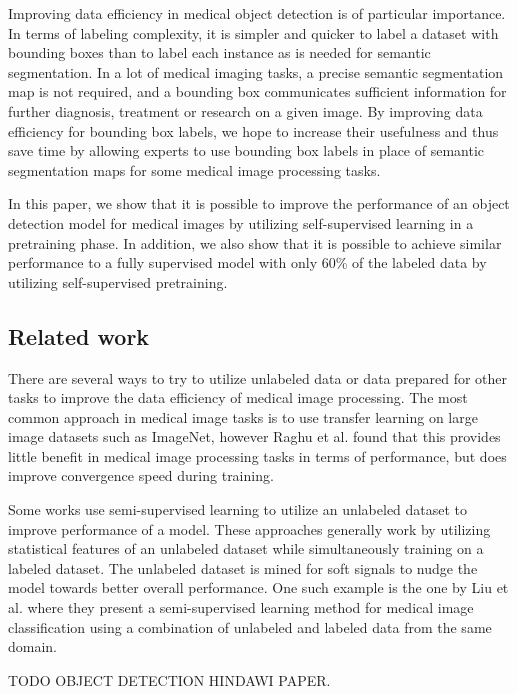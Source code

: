 \documentclass[conference]{IEEEtran}
\begin{document}
Improving data efficiency in medical object detection is of particular importance. 
In terms of labeling complexity, it is 
simpler and quicker to label a dataset with bounding boxes than to label each instance as is 
needed for semantic segmentation. In a lot of medical imaging tasks, a precise semantic 
segmentation map is not required, and a bounding box communicates sufficient information for 
further diagnosis, treatment or research on a given image. By improving data efficiency for 
bounding box labels, we hope to increase their usefulness and thus save time by allowing experts 
to use bounding box labels in place of semantic segmentation maps for some medical image processing
tasks.

In this paper, we show that it is possible to improve the performance of an object detection model
for medical images by utilizing self-supervised learning in a pretraining phase. In addition, we
also show that it is possible to achieve similar performance to a fully supervised model with
only 60\% of the labeled data by utilizing self-supervised pretraining.

\subsection{Related work}

There are several ways to try to utilize unlabeled data or data prepared for other tasks to improve
the data efficiency of medical image processing. The most common approach in medical image tasks is
to use transfer learning on large image datasets 
such as ImageNet, however Raghu et al. \cite{raghuTransfusionUnderstandingTransfer2019} found that
this provides little benefit in medical image processing tasks in terms of performance, but does
improve convergence speed during training.

Some works use semi-supervised learning to utilize an unlabeled dataset to improve
performance of a model. These approaches generally work by utilizing statistical features
of an unlabeled dataset while simultaneously training on a labeled dataset. The unlabeled
dataset is mined for soft signals to nudge the model towards better overall performance.
One such example is the one by Liu et al. \cite{liuSemisupervisedMedicalImage2020} where
they present a semi-supervised learning method for medical image classification using
a combination of unlabeled and labeled data from the same domain.

TODO OBJECT DETECTION HINDAWI PAPER.
\end{document}
